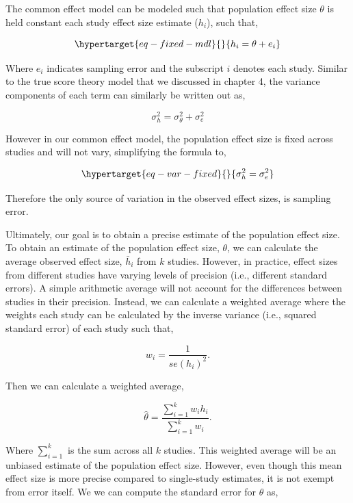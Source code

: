 \documentclass[
  letterpaper,
  DIV=11,
  numbers=noendperiod]{scrreprt}
\begin{document}
The common effect model can be modeled such that population effect size
\(\theta\) is held constant each study effect size estimate (\(h_i\)),
such that,

\begin{equation}\protect\hypertarget{eq-fixed-mdl}{}{
h_i  = \theta + e_i
}\label{eq-fixed-mdl}\end{equation}

Where \(e_i\) indicates sampling error and the subscript \(i\) denotes
each study. Similar to the true score theory model that we discussed in
chapter 4, the variance components of each term can similarly be written
out as,

\[
\sigma^2_h = \sigma^2_\theta + \sigma^2_e
\]

However in our common effect model, the population effect size is fixed
across studies and will not vary, simplifying the formula to,

\begin{equation}\protect\hypertarget{eq-var-fixed}{}{
\sigma^2_h = \sigma^2_e
}\label{eq-var-fixed}\end{equation}

Therefore the only source of variation in the observed effect sizes, is
sampling error.

Ultimately, our goal is to obtain a precise estimate of the population
effect size. To obtain an estimate of the population effect size,
\(\theta\), we can calculate the average observed effect size,
\(\bar{h}_i\) from \(k\) studies. However, in practice, effect sizes
from different studies have varying levels of precision (i.e., different
standard errors). A simple arithmetic average will not account for the
differences between studies in their precision. Instead, we can
calculate a weighted average where the weights each study can be
calculated by the inverse variance (i.e., squared standard error) of
each study such that,

\[
w_i = \frac{1}{se(h_i)^2}.
\]

Then we can calculate a weighted average,

\[
\hat{\theta} =\frac{\sum^k_{i=1}w_ih_i}{\sum^k_{i=1}w_i}.
\]

Where \(\sum^k_{i=1}\) is the sum across all \(k\) studies. This
weighted average will be an unbiased estimate of the population effect
size. However, even though this mean effect size is more precise
compared to single-study estimates, it is not exempt from error itself.
We we can compute the standard error for \(\hat{\theta}\) as,
\end{document}
